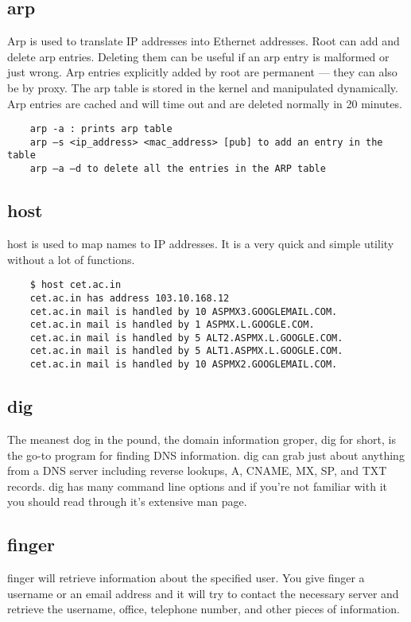 \documentclass[a4paper,12pt]{article}
\begin{document}
    \subsection{arp}
    Arp is used to translate IP addresses into Ethernet addresses.
    Root can add and delete arp entries. Deleting them can be useful if an arp entry is malformed or
     just wrong. Arp entries explicitly added by root are permanent — they can also be by proxy.
     The arp table is stored in the kernel and manipulated dynamically. Arp entries are cached and
     will time out and are deleted normally in 20 minutes.
    
     \begin{verbatim}
    arp -a : prints arp table
    arp –s <ip_address> <mac_address> [pub] to add an entry in the table
    arp –a –d to delete all the entries in the ARP table
     \end{verbatim}
    
    \subsection{host}
    host is used to map names to IP addresses. It is a very quick and simple utility without a lot of functions.
    
    \begin{verbatim}
    $ host cet.ac.in
    cet.ac.in has address 103.10.168.12
    cet.ac.in mail is handled by 10 ASPMX3.GOOGLEMAIL.COM.
    cet.ac.in mail is handled by 1 ASPMX.L.GOOGLE.COM.
    cet.ac.in mail is handled by 5 ALT2.ASPMX.L.GOOGLE.COM.
    cet.ac.in mail is handled by 5 ALT1.ASPMX.L.GOOGLE.COM.
    cet.ac.in mail is handled by 10 ASPMX2.GOOGLEMAIL.COM.
    \end{verbatim}
    
    \subsection{dig}
    
    The meanest dog in the pound, the domain information groper, dig for short, is the go-to program for finding DNS information. dig can grab just about anything from a DNS server including reverse lookups, A, CNAME, MX, SP, and TXT records. dig has many command line options and if you're not familiar with it you should read through it's extensive man page.
    
    
    \subsection{finger}
    finger will retrieve information about the specified user.
    You give finger a username or an email address and it will try to contact the necessary
    server and retrieve the username, office, telephone number, and other pieces of information.
    
\end{document}
